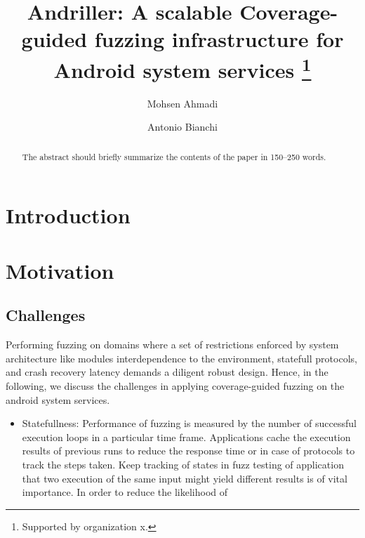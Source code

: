 \documentclass[runningheads]{llncs}
\begin{document}
%
\title{Andriller: A scalable Coverage-guided fuzzing infrastructure for Android system services \thanks{Supported by organization x.}}
%
%
\author{Mohsen Ahmadi \and
Antonio Bianchi} %
%
%
%
\maketitle              %
%
\begin{abstract}
The abstract should briefly summarize the contents of the paper in
150--250 words.

\end{abstract}
%
%
%
\section{Introduction}
\section{Motivation}
\subsection{Challenges} %
Performing fuzzing on domains where a set of restrictions enforced by system architecture like modules interdependence to the environment, statefull protocols, and crash recovery latency demands a diligent robust design. Hence, in the following, we discuss the challenges in applying coverage-guided fuzzing on the android system services. 
\begin{itemize}
    \item Statefullness: Performance of fuzzing is measured by the number of successful execution loops in a particular time frame. Applications cache the execution results of previous runs to reduce the response time or in case of protocols to track the steps taken. Keep tracking of states in fuzz testing of application that two execution of the same input might yield different results is of vital importance. In order to reduce the likelihood of 
\end{itemize}
\end{document}
